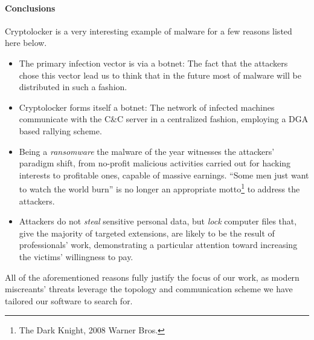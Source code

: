 \paragraph{Conclusions} Cryptolocker is a very interesting example of malware
for a few reasons listed here below.
\begin{itemize}
    \item The primary infection vector is via a botnet: The fact that the attackers
        chose this vector lead us to think that in the future most of malware
        will be distributed in such a fashion.
    \item Cryptolocker forms itself a botnet: The network of infected machines
        communicate with the C\&C server in a centralized fashion, employing
        a DGA based rallying scheme.
    \item Being a \emph{ransomware} the malware of the year witnesses the
        attackers' paradigm shift, from no-profit malicious activities carried
        out for hacking interests to profitable ones, capable of massive earnings.
        ``Some men just want to watch the world burn'' is no longer an appropriate
        motto\footnote{The Dark Knight, 2008 Warner Bros.} to address the attackers.
    \item Attackers do not \emph{steal} sensitive personal data, but \emph{lock}
        computer files that, give the majority of targeted extensions, are likely
        to be the result of professionals' work, demonstrating a particular
        attention toward increasing the victims' willingness to pay.
\end{itemize}

All of the aforementioned reasons fully justify the focus of our work, as modern
miscreants' threats leverage the topology and communication scheme we have
tailored our software to search for.



